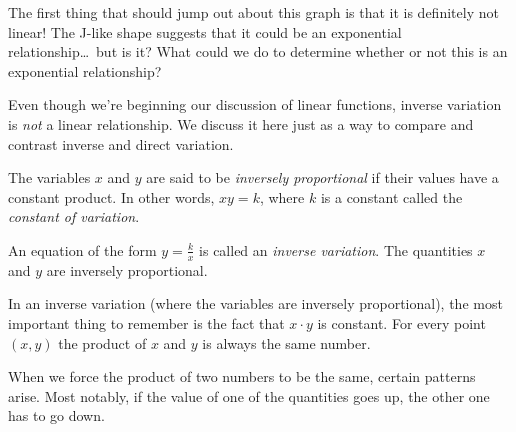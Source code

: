 The first thing that should jump out about this graph is that it is definitely not linear! The J-like shape suggests that it could be an exponential relationship\ldots\ but is it? What could we do to determine whether or not this is an exponential relationship?

\begin{boxedwarning}
Even though we're beginning our discussion of linear functions, inverse variation is \textit{not} a linear relationship. We discuss it here just as a way to compare and contrast inverse and direct variation.
\end{boxedwarning}

\begin{boxeddef}
The variables $x$ and $y$ are said to be \textit{inversely proportional} if their values have a constant product. In other words, $xy = k$, where $k$ is a constant called the \textit{constant of variation}.

An equation of the form $y = \frac{k}{x}$ is called an \textit{inverse variation}. The quantities $x$ and $y$ are inversely proportional.
\end{boxeddef}

In an inverse variation (where the variables are inversely proportional), the most important thing to remember is the fact that $x \cdot y$ is constant. For every point $(x, y)$ the product of $x$ and $y$ is always the same number.

When we force the product of two numbers to be the same, certain patterns arise. Most notably, if the value of one of the quantities goes up, the other one has to go down.

%

